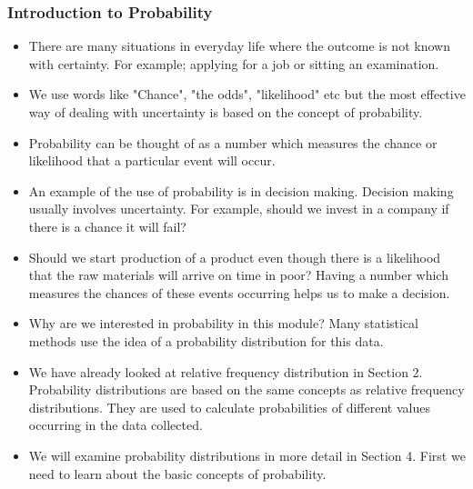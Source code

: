 \documentclass[IntroMain.tex]{subfiles}
\begin{document}

\begin{frame}
	\frametitle{Introduction to Probability}
\begin{itemize}
\item	There are many situations in everyday life where the outcome is not known with certainty. For example; applying for a job or sitting an examination.
	
\item We use words like "Chance", "the odds", "likelihood" etc but the most effective way of dealing with uncertainty is based on the concept of probability.
	
\item Probability can be thought of as a number which measures the chance or likelihood that a particular event will occur.
	
\end{itemize}	

	
\end{frame}
\begin{frame}
	\begin{itemize}
\item	An example of the use of probability is in decision making. Decision making usually involves uncertainty. For example, should we invest in a company if there is a chance it will fail? 
	
\item	Should we start production of a product even though there is a likelihood that the raw materials will arrive on time in poor? Having a number which measures the chances of these events occurring helps us to make a decision.
	
\item 	Why are we interested in probability in this module? Many statistical methods use the idea of a probability distribution for this data.
	\end{itemize}

	
	
\end{frame}
\begin{frame}
\begin{itemize}	
\item	We have already looked at relative frequency distribution in Section 2. Probability distributions are based on the same concepts as relative frequency distributions. They are used to calculate probabilities of different values occurring in the data collected.
	
\item	We will examine probability distributions in more detail in Section 4. First we need to learn about the basic concepts of probability.
\end{itemize}
	
\end{frame}
\end{document}
